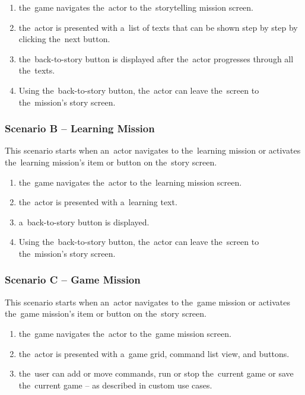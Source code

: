 \begin{enumerate}
    \item the~game navigates the~actor to the~storytelling mission screen.
    \item the~actor is presented with a~list of texts that can be shown step by step by clicking the~next button.
    \item the~back-to-story button is displayed after the~actor progresses through all the~texts.
    \item Using the~back-to-story button, the~actor can leave the~screen to the~mission's story screen.
\end{enumerate}

\subsubsection*{Scenario B -- Learning Mission}

This scenario starts when an~actor navigates to the~learning mission or activates the~learning mission's item or button on the~story screen.

\begin{enumerate}
    \item the~game navigates the~actor to the~learning mission screen.
    \item the~actor is presented with a~learning text.
    \item a~back-to-story button is displayed.
    \item Using the~back-to-story button, the~actor can leave the~screen to the~mission's story screen.
\end{enumerate}

\subsubsection*{Scenario C -- Game Mission}

This scenario starts when an~actor navigates to the~game mission or activates the~game mission's item or button on the~story screen.

\begin{enumerate}
    \item the~game navigates the~actor to the~game mission screen.
    \item the~actor is presented with a~game grid, command list view, and buttons.
    \item the~user can add or move commands, run or stop the~current game or save the~current game -- as described in custom use cases.
\end{enumerate}

